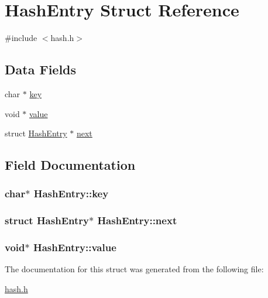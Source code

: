 \hypertarget{structHashEntry}{\section{Hash\+Entry Struct Reference}
\label{structHashEntry}
}


{\ttfamily \#include $<$hash.\+h$>$}

\subsection*{Data Fields}
\begin{DoxyCompactItemize}
\item 
char $\ast$ \hyperlink{structHashEntry_a8387cf9ab72dc2d7be2e8e069f70c814}{key}
\item 
void $\ast$ \hyperlink{structHashEntry_a97b507b5f2b4c90958dc6a4a47a86425}{value}
\item 
struct \hyperlink{structHashEntry}{Hash\+Entry} $\ast$ \hyperlink{structHashEntry_aebaa91e676cc52b668a64f6799a1260b}{next}
\end{DoxyCompactItemize}


\subsection{Field Documentation}
\hypertarget{structHashEntry_a8387cf9ab72dc2d7be2e8e069f70c814}{
\subsubsection[{key}]{\setlength{\rightskip}{0pt plus 5cm}char$\ast$ Hash\+Entry\+::key}}\label{structHashEntry_a8387cf9ab72dc2d7be2e8e069f70c814}
\hypertarget{structHashEntry_aebaa91e676cc52b668a64f6799a1260b}{
\subsubsection[{next}]{\setlength{\rightskip}{0pt plus 5cm}struct {\bf Hash\+Entry}$\ast$ Hash\+Entry\+::next}}\label{structHashEntry_aebaa91e676cc52b668a64f6799a1260b}
\hypertarget{structHashEntry_a97b507b5f2b4c90958dc6a4a47a86425}{
\subsubsection[{value}]{\setlength{\rightskip}{0pt plus 5cm}void$\ast$ Hash\+Entry\+::value}}\label{structHashEntry_a97b507b5f2b4c90958dc6a4a47a86425}


The documentation for this struct was generated from the following file\+:\begin{DoxyCompactItemize}
\item 
\hyperlink{hash_8h}{hash.\+h}\end{DoxyCompactItemize}
